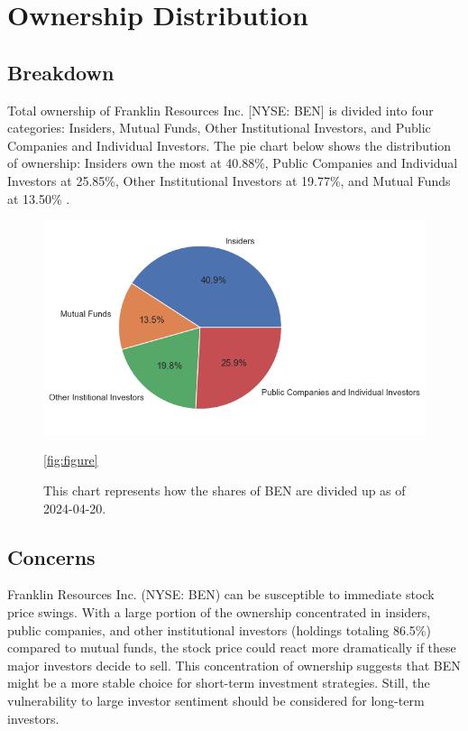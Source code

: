 \documentclass[9pt,a4paper,twoside]{tau}
\begin{document}
\section{Ownership Distribution}
    \subsection{Breakdown}
        
        Total ownership of Franklin Resources Inc. [NYSE: BEN] is divided into four categories: Insiders, Mutual Funds, Other Institutional Investors, and Public Companies and Individual Investors. The pie chart below shows the distribution of ownership: Insiders own the most at 40.88\%, Public Companies and Individual Investors at 25.85\%, Other Institutional Investors at 19.77\%, and Mutual Funds at 13.50\% \cite{tip-ranks-2024}.

            \begin{figure}[H]
                \centering
                \includegraphics[width=0.85\columnwidth]{Figures/OwnershipPieChart.png}
                \caption{This chart represents how the shares of BEN are divided up as of 2024-04-20.}
                \ref{fig:figure}
            \end{figure}

    \subsection{Concerns}
    
        Franklin Resources Inc. (NYSE: BEN) can be susceptible to immediate stock price swings. With a large portion of the ownership concentrated in insiders, public companies, and other institutional investors (holdings totaling 86.5\%) compared to mutual funds, the stock price could react more dramatically if these major investors decide to sell. This concentration of ownership suggests that BEN might be a more stable choice for short-term investment strategies. Still, the vulnerability to large investor sentiment should be considered for long-term investors.
\end{document}
